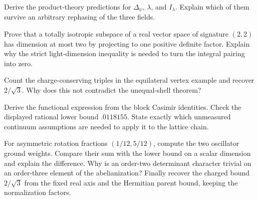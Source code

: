 \begin{exercise}\label{ex:identification-product}
Derive the product-theory predictions for $\Delta_\psi$,
$\lambda$, and $I_\lambda$. Explain which of them survive an
arbitrary rephasing of the three fields.

\par\smallskip{}\par
\end{exercise}
\begin{exercise}\label{ex:identification-Narain}
Prove that a totally isotropic subspace of a real vector space of
signature $(2,2)$ has dimension at most two by projecting to one
positive definite factor. Explain why the strict light-dimension
inequality is needed to turn the integral pairing into zero.

\par\smallskip{}\par
\end{exercise}
\begin{exercise}\label{ex:identification-triad}
Count the charge-conserving triples in the equilateral vertex
example and recover $2/\sqrt3$. Why does this not contradict the
unequal-shell theorem?

\par\smallskip{}\par
\end{exercise}
\begin{exercise}\label{ex:identification-crossing}
Derive the functional expression from the block Casimir identities.
Check the displayed rational lower bound $.0118155$. State exactly
which unmeasured continuum assumptions are needed to apply it to
the lattice chain.

\par\smallskip{}\par
\end{exercise}
\begin{exercise}\label{ex:identification-orbifold}
For asymmetric rotation fractions $(1/12,5/12)$, compute the
two oscillator ground weights. Compare their sum with the
lower bound on a scalar dimension and explain the difference.
Why is an order-two determinant character trivial on an
order-three element of the abelianization? Finally recover
the charged bound $2/\sqrt3$ from the fixed real axis and the
Hermitian parent bound, keeping the normalization factors.

\par\smallskip{}\par
\end{exercise}
